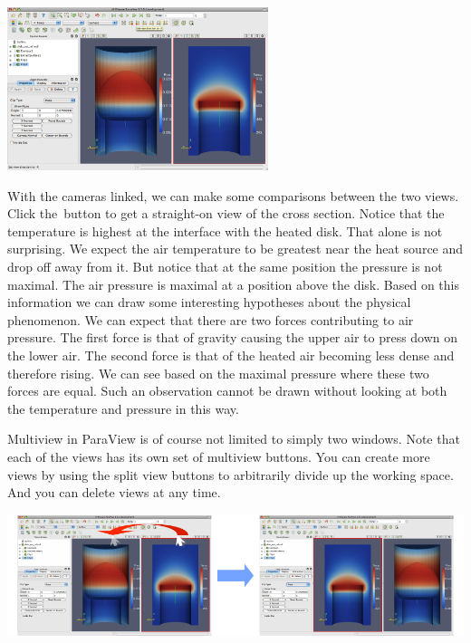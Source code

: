 \begin{inlinefig}
  \includegraphics[width=3in]{images/CameraLink}
\end{inlinefig}

With the cameras linked, we can make some comparisons between the two
views.  Click the~\xPlus button to get a straight-on view of the cross section.
Notice that the temperature is highest at the interface with the heated
disk.  That alone is not surprising.  We expect the air temperature to be
greatest near the heat source and drop off away from it.  But notice that
at the same position the pressure is not maximal.  The air pressure is
maximal at a position above the disk.  Based on this information we can
draw some interesting hypotheses about the physical phenomenon.  We can
expect that there are two forces contributing to air pressure.  The first
force is that of gravity causing the upper air to press down on the lower
air.  The second force is that of the heated air becoming less dense and
therefore rising.  We can see based on the maximal pressure where these two
forces are equal.  Such an observation cannot be drawn without looking at
both the temperature and pressure in this way.

Multiview in ParaView is of course not limited to simply two windows.  Note
that each of the views has its own set of multiview buttons.  You can
create more views by using the split view buttons \splitViewH \splitViewV
to arbitrarily divide up the working space.  And you can delete views
\deleteView at any time.

\begin{inlinefig}
  \includegraphics[width=\linewidth]{images/SwapViews}
\end{inlinefig}

